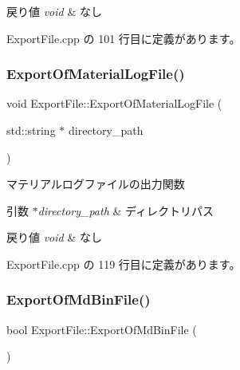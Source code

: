 \begin{DoxyRetVals}{戻り値}
{\em void} & なし \\
\hline
\end{DoxyRetVals}


 Export\+File.\+cpp の 101 行目に定義があります。

\mbox{\label{class_export_file_a1a5927dcc9f77a33c3cde8e0f15161f3}} 
\subsubsection{\texorpdfstring{Export\+Of\+Material\+Log\+File()}{ExportOfMaterialLogFile()}}
{\footnotesize\ttfamily void Export\+File\+::\+Export\+Of\+Material\+Log\+File (\begin{DoxyParamCaption}\item[{std\+::string $\ast$}]{directory\+\_\+path }\end{DoxyParamCaption})\hspace{0.3cm}{\ttfamily [private]}}



マテリアルログファイルの出力関数 


\begin{DoxyParams}{引数}
{\em $\ast$directory\+\_\+path} & ディレクトリパス \\
\hline
\end{DoxyParams}

\begin{DoxyRetVals}{戻り値}
{\em void} & なし \\
\hline
\end{DoxyRetVals}


 Export\+File.\+cpp の 119 行目に定義があります。

\mbox{\label{class_export_file_a16e769db1683d63e0e4dbf809bd8704e}} 
\subsubsection{\texorpdfstring{Export\+Of\+Md\+Bin\+File()}{ExportOfMdBinFile()}}
{\footnotesize\ttfamily bool Export\+File\+::\+Export\+Of\+Md\+Bin\+File (\begin{DoxyParamCaption}{ }\end{DoxyParamCaption})\hspace{0.3cm}{\ttfamily [private]}}




